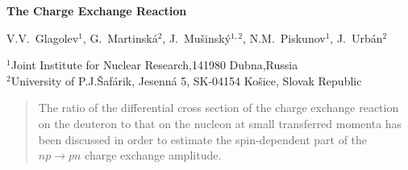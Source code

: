 \documentclass[a4paper,12pt]{article}
\begin{document}
\vspace{2cm}
\begin{center}
  \LARGE\bf {The Charge Exchange Reaction} 
\end{center}
V.V.~Glagolev$^{1}$, G.~Martinsk\'{a}$^{2}$, J.~Mu\v{s}insk\'{y}$^{1,2}$,
N.M.~Piskunov$^{1}$, J.~Urb\'{a}n$^{2}$

\bigskip
\small{
  \noindent
  $^{1}$Joint Institute for Nuclear Research,141980 Dubna,Russia \\
  $^{2}$University of P.J.\v{S}af\'{a}rik, Jesenn\'{a} 5, SK-04154 Ko\v{s}ice,
  Slovak Republic
}

\bigskip
\begin{abstract}
  \noindent
  The ratio of the differential cross section of the charge exchange reaction on
  the deuteron to that on the nucleon at small transferred momenta has been
  discussed in order to estimate the spin-dependent part of the $np \to pn$
  charge exchange amplitude.
\end{abstract}

\vspace{1cm}
\end{document}
